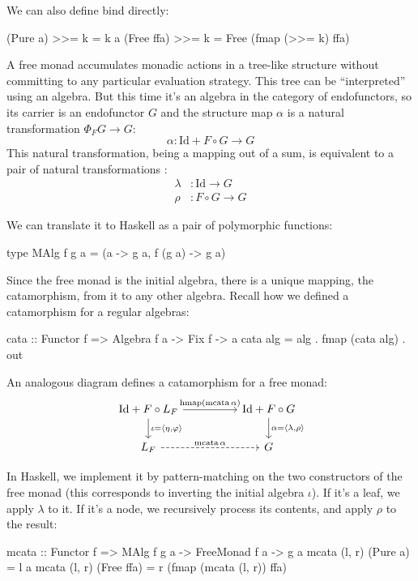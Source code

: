 \documentclass[DaoFP]{subfiles}
\begin{document}
We can also define bind directly:
\begin{haskell}
  (Pure a)   >>= k = k a
  (Free ffa) >>= k = Free (fmap (>>= k) ffa)
\end{haskell}

A free monad accumulates monadic actions in a tree-like structure without committing to any particular evaluation strategy. This tree can be ``interpreted'' using an algebra. But this time it's an algebra in the category of endofunctors, so its carrier is an endofunctor $G$ and the structure map $\alpha$ is a natural transformation $\Phi_F G \to G$:
\[ \alpha \colon \text{Id} + F \circ G \to G\]
This natural transformation, being a mapping out of a sum, is equivalent to a pair of natural transformations :
\begin{align*}
\lambda &\colon \text{Id} \to G
\\
\rho &\colon F \circ G \to G
\end{align*}

We can translate it to Haskell as a pair of polymorphic functions:
\begin{haskell}
type MAlg f g a = (a -> g a, f (g a) -> g a)
\end{haskell}

Since the free monad is the initial algebra, there is a unique mapping, the catamorphism, from it to any other algebra. Recall how we defined a catamorphism for a regular algebras:
\begin{haskell}
cata :: Functor f => Algebra f a -> Fix f -> a
cata alg = alg . fmap (cata alg) . out
\end{haskell}

An analogous diagram defines a catamorphism for a free monad:
\[
 \begin{tikzcd}
 \text{Id} + F \circ L_F
 \arrow[rr, "{\text{hmap} (\text{mcata}\, \alpha)}"]
 \arrow[d, "{\iota = \langle \eta, \varphi \rangle}"]
 && \text{Id} + F \circ G
\arrow[d, "{\alpha = \langle \lambda, \rho \rangle}"]
 \\
 L_F
 \arrow[rr, dashed, "\text{mcata}\, \alpha"]
 && G
  \end{tikzcd}
\]

In Haskell, we implement it by pattern-matching on the two constructors of the free monad (this corresponds to inverting the initial algebra $\iota$). If it's a leaf, we apply $\lambda$ to it. If it's a node, we recursively process its contents, and apply $\rho$ to the result:
\begin{haskell}
mcata :: Functor f => MAlg f g a -> FreeMonad f a -> g a
mcata (l, r) (Pure a) = l a
mcata (l, r) (Free ffa) = 
  r (fmap (mcata (l, r)) ffa)
\end{haskell}
\end{document}

